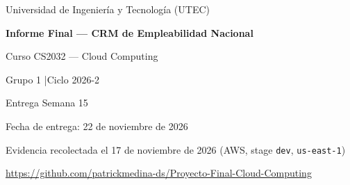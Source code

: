 \documentclass[11pt,a4paper]{article}
\begin{document}
\begin{titlepage}
\centering
\vspace*{3cm}
{\Large Universidad de Ingeniería y Tecnología (UTEC)\par}
\vspace{1cm}
{\huge\bfseries Informe Final --- CRM de Empleabilidad Nacional\par}
\vspace{1.5cm}
{\Large Curso CS2032 --- Cloud Computing\par}
\vspace{0.5cm}
{\large Grupo 1 \quad|\quad Ciclo 2026-2\par}
\vspace{2cm}
{\large Entrega Semana 15\par}
{\large Fecha de entrega: 22 de noviembre de 2026\par}
\vspace{1cm}
{\normalsize Evidencia recolectada el 17 de noviembre de 2026 (AWS, stage \texttt{dev}, \texttt{us-east-1})\par}
\vspace{1.5cm}
\url{https://github.com/patrickmedina-ds/Proyecto-Final-Cloud-Computing}
\end{titlepage}
\tableofcontents
\newpage









\end{document}
